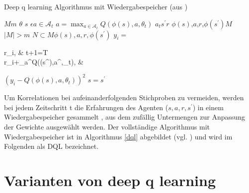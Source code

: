 \begin{algorithm}[b!]
\caption{Deep q learning Algorithmus mit Wiedergabespeicher (aus \parencite{antari})}\label{dql}
\begin{algorithmic}[t!]
      \State {}$M$$m$
      \State {}$\theta$
      	\State {}$s$
			\State {}$\epsilon$$a\in\mathcal{A}_t$\text{,}
			\State {}$a = \max_{a\in\mathcal{A}_t}Q(\phi(s),a,\theta_t)$
			\State {}$a_t$$s^\prime$$r$
			\State {}$\phi(s)$,$a$,$r$,$\phi(s^\prime)$$M$
			\State {}$\vert M \vert>m$
			\State {}$N \subset M$$\phi(s),a,r,\phi(s^\prime)$
			\State {}
			$y_i=$
			\begin{cases} 
				r_i, & t+1=T\\ r_i+\gamma\max_{a^\prime}Q(\phi(s^\prime),a^\prime,\theta_t), & 
			\end{cases}
    		\State {}$(y_i - Q(\phi(s),a,\theta_t))^2$
    		\State {}$s=s^\prime$
    	\EndFor
      \EndFor
\end{algorithmic}
\end{algorithm}

Um Korrelationen bei aufeinanderfolgenden Stichproben zu vermeiden, werden bei jedem Zeitschritt t die Erfahrungen des Agenten ($s, a, r, s^\prime$) in einem Wiedergabespeicher gesammelt \parencite{Lin1992ReinforcementLF}, aus dem zufällig Untermengen zur Anpassung der Gewichte ausgewählt werden. 
Der vollständige Algorithmus mit Wiedergabespeicher ist in Algorithmus \ref{dql} abgebildet (vgl. \parencite{antari}) und wird im Folgenden als \acs{DQL} bezeichnet.

\section{Varianten von deep q learning}
\label{sec:varianten}


